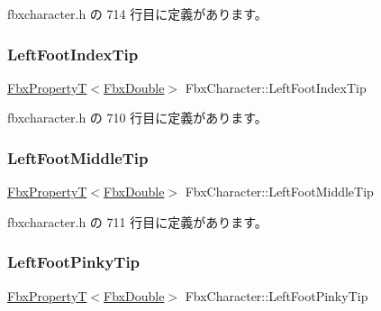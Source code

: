  fbxcharacter.\+h の 714 行目に定義があります。

\mbox{\label{class_fbx_character_aa6e084ea66b64dc56e1c1fe9c02623c5}} 
\subsubsection{\texorpdfstring{Left\+Foot\+Index\+Tip}{LeftFootIndexTip}}
{\footnotesize\ttfamily \hyperlink{class_fbx_property_t}{Fbx\+PropertyT}$<$\hyperlink{fbxtypes_8h_a171e72a1c46fc15c1a6c9c31948c1c5b}{Fbx\+Double}$>$ Fbx\+Character\+::\+Left\+Foot\+Index\+Tip}



 fbxcharacter.\+h の 710 行目に定義があります。

\mbox{\label{class_fbx_character_ab17d6be58ceb88b575305663a5e37b3d}} 
\subsubsection{\texorpdfstring{Left\+Foot\+Middle\+Tip}{LeftFootMiddleTip}}
{\footnotesize\ttfamily \hyperlink{class_fbx_property_t}{Fbx\+PropertyT}$<$\hyperlink{fbxtypes_8h_a171e72a1c46fc15c1a6c9c31948c1c5b}{Fbx\+Double}$>$ Fbx\+Character\+::\+Left\+Foot\+Middle\+Tip}



 fbxcharacter.\+h の 711 行目に定義があります。

\mbox{\label{class_fbx_character_ab6770f15c802efcd4b85d89b1b6464be}} 
\subsubsection{\texorpdfstring{Left\+Foot\+Pinky\+Tip}{LeftFootPinkyTip}}
{\footnotesize\ttfamily \hyperlink{class_fbx_property_t}{Fbx\+PropertyT}$<$\hyperlink{fbxtypes_8h_a171e72a1c46fc15c1a6c9c31948c1c5b}{Fbx\+Double}$>$ Fbx\+Character\+::\+Left\+Foot\+Pinky\+Tip}



